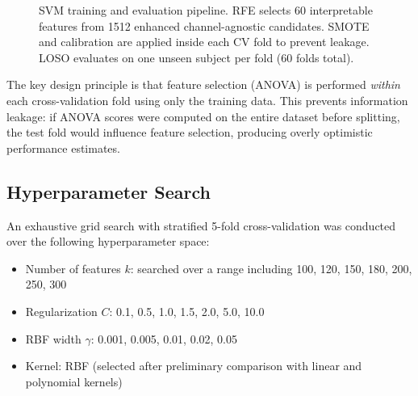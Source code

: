 \documentclass[12pt,a4paper]{article}
\begin{document}
\begin{figure}[H]
\centering
{}
\caption{SVM training and evaluation pipeline. RFE selects 60 interpretable features from 1512 enhanced channel-agnostic candidates. SMOTE and calibration are applied inside each CV fold to prevent leakage. LOSO evaluates on one unseen subject per fold (60 folds total).}
\label{fig:svm_pipeline}
\end{figure}

The key design principle is that feature selection (ANOVA) is performed \emph{within} each cross-validation fold using only the training data. This prevents information leakage: if ANOVA scores were computed on the entire dataset before splitting, the test fold would influence feature selection, producing overly optimistic performance estimates.

\subsection{Hyperparameter Search}

An exhaustive grid search with stratified 5-fold cross-validation was conducted over the following hyperparameter space:

\begin{itemize}
  \item Number of features $k$: searched over a range including 100, 120, 150, 180, 200, 250, 300
  \item Regularization $C$: 0.1, 0.5, 1.0, 1.5, 2.0, 5.0, 10.0
  \item RBF width $\gamma$: 0.001, 0.005, 0.01, 0.02, 0.05
  \item Kernel: RBF (selected after preliminary comparison with linear and polynomial kernels)
\end{itemize}
\end{document}
